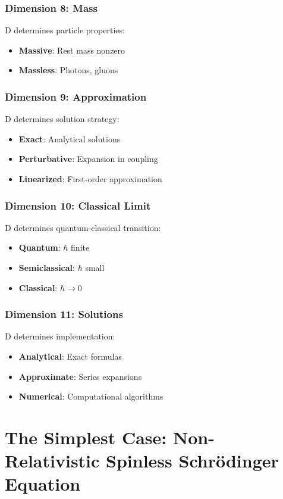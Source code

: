 \documentclass[12pt,oneside]{book}
\begin{document}
\subsection{Dimension 8: Mass}
D determines particle properties:
\begin{itemize}
  \item \textbf{Massive}: Rest mass nonzero
  \item \textbf{Massless}: Photons, gluons
\end{itemize}

\subsection{Dimension 9: Approximation}
D determines solution strategy:
\begin{itemize}
  \item \textbf{Exact}: Analytical solutions
  \item \textbf{Perturbative}: Expansion in coupling
  \item \textbf{Linearized}: First-order approximation
\end{itemize}

\subsection{Dimension 10: Classical Limit}
D determines quantum-classical transition:
\begin{itemize}
  \item \textbf{Quantum}: $\hbar$ finite
  \item \textbf{Semiclassical}: $\hbar$ small
  \item \textbf{Classical}: $\hbar \to 0$
\end{itemize}

\subsection{Dimension 11: Solutions}
D determines implementation:
\begin{itemize}
  \item \textbf{Analytical}: Exact formulas
  \item \textbf{Approximate}: Series expansions
  \item \textbf{Numerical}: Computational algorithms
\end{itemize}

\chapter{The Simplest Case: Non-Relativistic Spinless Schrödinger Equation}
\end{document}

